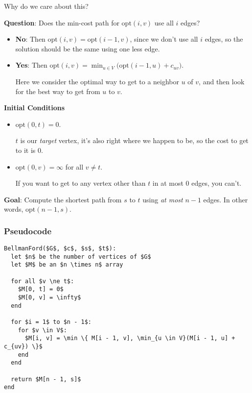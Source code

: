 \documentclass[12pt]{article}
\def\opt{\text{opt}}
\begin{document}
  \QUESTION{} Why do we care about this?

  {\bf Question}: Does the min-cost path for $\opt(i, v)$ use all $i$ edges?

  \begin{itemize}
    \item {\bf No}: Then $\opt(i, v) = \opt(i - 1, v)$, since we don't use all
      $i$ edges, so the solution should be the same using one less edge.

    \item {\bf Yes}: Then $\opt(i, v) = \min_{u \in V}\big(\opt(i - 1, u) +
      c_{uv}\big)$.

      Here we consider the optimal way to get to a neighbor $u$ of $v$, and then
      look for the best way to get from $u$ to $v$.
  \end{itemize}


  {\bf Initial Conditions}

  \begin{itemize}
    \item $\opt(0, t) = 0$.

      $t$ is our {\it target} vertex, it's also right where we happen to be, so
      the cost to get to it is $0$.

    \item $\opt(0, v) = \infty$ for all $v \ne t$.

      If you want to get to any vertex other than $t$ in at most $0$ edges, you
      can't.

  \end{itemize}

  {\bf Goal}: Compute the shortest path from $s$ to $t$ using {\it at most} $n -
  1$ edges. In other words, $\opt(n - 1, s)$.

  \subsubsection{Pseudocode}

  \begin{lstlisting}
BellmanFord($G$, $c$, $s$, $t$):
  let $n$ be the number of vertices of $G$
  let $M$ be an $n \times n$ array

  for all $v \ne t$:
    $M[0, t] = 0$
    $M[0, v] = \infty$
  end

  for $i = 1$ to $n - 1$:
    for $v \in V$:
      $M[i, v] = \min \{ M[i - 1, v], \min_{u \in V}(M[i - 1, u] + c_{uv}) \}$
    end
  end

  return $M[n - 1, s]$
end
  \end{lstlisting}
\end{document}
